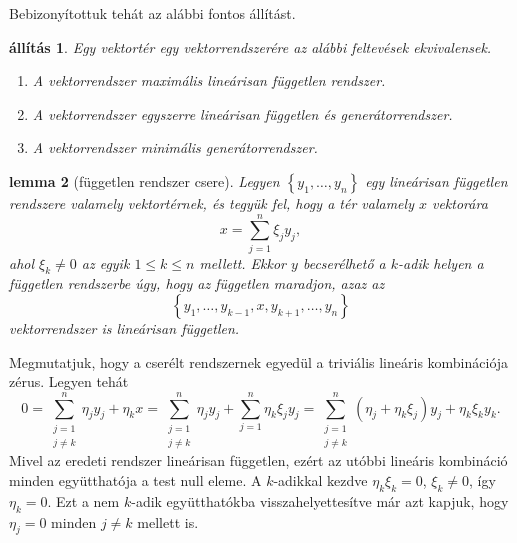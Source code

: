 \documentclass[9pt, a4paper, showtrims]{memoir}
\makeatletter
\renewenvironment{proof}[1][\proofname]
    {\par\pushQED{\qed}%
    \normalfont \topsep6\p@\@plus6\p@\relax
    \trivlist
    \item[\hskip\labelsep
        \itshape
    #1\@addpunct{:}]\ignorespaces}
    {\popQED\endtrivlist\@endpefalse}
\theoremstyle{plain}
\newtheorem{proposition}{állítás}[chapter]
\newtheorem{lemma}[proposition]{lemma}
\theoremstyle{remark}
\theoremstyle{definition}
\makeatother
\begin{document}
Bebizonyítottuk tehát az alábbi fontos állítást.
\begin{proposition}
	Egy vektortér egy vektorrendszerére az alábbi feltevések ekvivalensek.
	\begin{enumerate}
		\item A vektorrendszer maximális lineárisan független rendszer.
		\item A vektorrendszer egyszerre lineárisan független és generátorrendszer.
		\item A vektorrendszer minimális generátorrendszer.\qedhere
	\end{enumerate}
    \label{pr:maxmin}
\end{proposition}
\begin{lemma}[független rendszer csere]\label{le:fgtlncsere}
	Legyen $\left\{ y_1,\ldots,y_n \right\}$ egy lineárisan független rendszere valamely vektortérnek,
	és tegyük fel, hogy a tér valamely $x$ vektorára
	\[
		x=\sum_{j=1}^n\xi_jy_j,
	\]
	ahol $\xi_k\neq 0$ az egyik $1\leq k\leq n$ mellett.
	Ekkor $y$ becserélhető a $k$-adik helyen a független rendszerbe
	úgy, hogy az független maradjon, azaz az
	\[
		\left\{ y_1,\ldots,y_{k-1},x,y_{k+1},\ldots,y_n \right\}
	\]
	vektorrendszer is lineárisan független.
\end{lemma}
\begin{proof}
	Megmutatjuk, hogy a cserélt rendszernek egyedül a triviális lineáris kombinációja zérus.
	Legyen tehát
	\[
		0
		=\sum_{\substack{j=1\\j\neq k}}^n\eta_jy_j+\eta_kx
		=\sum_{\substack{j=1\\j\neq k}}^n\eta_jy_j+\sum_{j=1}^n\eta_k\xi_jy_j
		=\sum_{\substack{j=1\\j\neq k}}^n\left( \eta_j+\eta_k\xi_j \right)y_j+\eta_k\xi_ky_k.
	\]
	Mivel az eredeti rendszer lineárisan független,
	ezért az utóbbi lineáris kombináció minden együtthatója a test null eleme.
	A $k$-adikkal kezdve $\eta_k\xi_k=0$, $\xi_k\neq 0$, így $\eta_k=0$.
	Ezt a nem $k$-adik együtthatókba visszahelyettesítve
	már azt kapjuk, hogy $\eta_j=0$ minden $j\neq k$ mellett is.
\end{proof}
\end{document}
